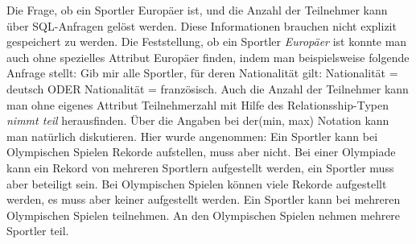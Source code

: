 \documentclass{bschlangaul-aufgabe}
\begin{document}
\begin{bAntwort}
Die Frage, ob ein Sportler Europäer ist, und die Anzahl der Teilnehmer
kann über SQL-Anfragen gelöst werden. Diese Informationen brauchen
nicht explizit gespeichert zu werden. Die Feststellung, ob ein Sportler
\emph{Europäer} ist konnte man auch ohne spezielles Attribut Europäer
ﬁnden, indem man beispielsweise folgende Anfrage stellt: Gib mir alle
Sportler, für deren Nationalität gilt: Nationalität = deutsch ODER
Nationalität = französisch. Auch die Anzahl der Teilnehmer kann man ohne
eigenes Attribut Teilnehmerzahl mit Hilfe des Relationsship-Typen
\emph{nimmt teil} herausﬁnden. Über die Angaben bei der(min, max)
Notation kann man natürlich diskutieren. Hier wurde angenommen: Ein
Sportler kann bei Olympischen Spielen Rekorde aufstellen, muss aber
nicht. Bei einer Olympiade kann ein Rekord von mehreren Sportlern
aufgestellt werden, ein Sportler muss aber beteiligt sein. Bei
Olympischen Spielen können viele Rekorde aufgestellt werden, es muss
aber keiner aufgestellt werden. Ein Sportler kann bei mehreren
Olympischen Spielen teilnehmen. An den Olympischen Spielen nehmen
mehrere Sportler teil.
\end{bAntwort}
\end{document}
